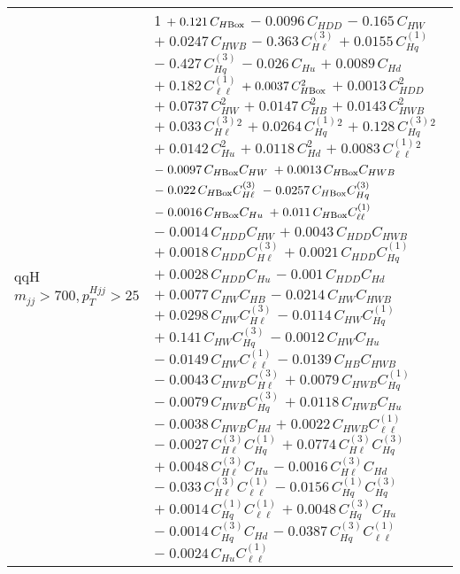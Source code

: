 \begin{tabular}{l|p{}}
    qqH $m_{jj} > 700, p_{T}^{Hjj} > 25$ & 1 $+\;0.121\,C_{H\rm{Box}}$ $-\;0.0096\,C_{HDD}$ $-\;0.165\,C_{HW}$ $+\;0.0247\,C_{HWB}$ $-\;0.363\,C^{(3)}_{H\ell}$ $+\;0.0155\,C^{(1)}_{Hq}$ $-\;0.427\,C^{(3)}_{Hq}$ $-\;0.026\,C_{Hu}$ $+\;0.0089\,C_{Hd}$ $+\;0.182\,C^{(1)}_{\ell\ell}$ $+\;0.0037\,C_{H\rm{Box}}^{2}$ $+\;0.0013\,C_{HDD}^{2}$ $+\;0.0737\,C_{HW}^{2}$ $+\;0.0147\,C_{HB}^{2}$ $+\;0.0143\,C_{HWB}^{2}$ $+\;0.033\,C^{(3)}_{H\ell}^{2}$ $+\;0.0264\,C^{(1)}_{Hq}^{2}$ $+\;0.128\,C^{(3)}_{Hq}^{2}$ $+\;0.0142\,C_{Hu}^{2}$ $+\;0.0118\,C_{Hd}^{2}$ $+\;0.0083\,C^{(1)}_{\ell\ell}^{2}$ $-\;0.0097\,C_{H\rm{Box}}C_{HW}$ $+\;0.0013\,C_{H\rm{Box}}C_{HWB}$ $-\;0.022\,C_{H\rm{Box}}C^{(3)}_{H\ell}$ $-\;0.0257\,C_{H\rm{Box}}C^{(3)}_{Hq}$ $-\;0.0016\,C_{H\rm{Box}}C_{Hu}$ $+\;0.011\,C_{H\rm{Box}}C^{(1)}_{\ell\ell}$ $-\;0.0014\,C_{HDD}C_{HW}$ $+\;0.0043\,C_{HDD}C_{HWB}$ $+\;0.0018\,C_{HDD}C^{(3)}_{H\ell}$ $+\;0.0021\,C_{HDD}C^{(1)}_{Hq}$ $+\;0.0028\,C_{HDD}C_{Hu}$ $-\;0.001\,C_{HDD}C_{Hd}$ $+\;0.0077\,C_{HW}C_{HB}$ $-\;0.0214\,C_{HW}C_{HWB}$ $+\;0.0298\,C_{HW}C^{(3)}_{H\ell}$ $-\;0.0114\,C_{HW}C^{(1)}_{Hq}$ $+\;0.141\,C_{HW}C^{(3)}_{Hq}$ $-\;0.0012\,C_{HW}C_{Hu}$ $-\;0.0149\,C_{HW}C^{(1)}_{\ell\ell}$ $-\;0.0139\,C_{HB}C_{HWB}$ $-\;0.0043\,C_{HWB}C^{(3)}_{H\ell}$ $+\;0.0079\,C_{HWB}C^{(1)}_{Hq}$ $-\;0.0079\,C_{HWB}C^{(3)}_{Hq}$ $+\;0.0118\,C_{HWB}C_{Hu}$ $-\;0.0038\,C_{HWB}C_{Hd}$ $+\;0.0022\,C_{HWB}C^{(1)}_{\ell\ell}$ $-\;0.0027\,C^{(3)}_{H\ell}C^{(1)}_{Hq}$ $+\;0.0774\,C^{(3)}_{H\ell}C^{(3)}_{Hq}$ $+\;0.0048\,C^{(3)}_{H\ell}C_{Hu}$ $-\;0.0016\,C^{(3)}_{H\ell}C_{Hd}$ $-\;0.033\,C^{(3)}_{H\ell}C^{(1)}_{\ell\ell}$ $-\;0.0156\,C^{(1)}_{Hq}C^{(3)}_{Hq}$ $+\;0.0014\,C^{(1)}_{Hq}C^{(1)}_{\ell\ell}$ $+\;0.0048\,C^{(3)}_{Hq}C_{Hu}$ $-\;0.0014\,C^{(3)}_{Hq}C_{Hd}$ $-\;0.0387\,C^{(3)}_{Hq}C^{(1)}_{\ell\ell}$ $-\;0.0024\,C_{Hu}C^{(1)}_{\ell\ell}$ \\
\end{tabular}